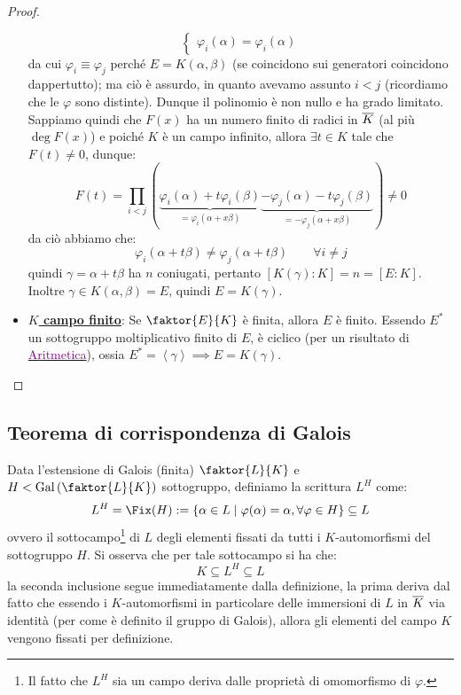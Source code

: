 \documentclass[11pt]{scrartcl}
\begin{document}
\begin{proof}
\begin{itemize}
\[\begin{cases}
                \varphi_i(\alpha) = \varphi_i(\alpha)
            \end{cases}
            \]
        da cui $\varphi_i \equiv \varphi_j$ perché $E = K(\alpha,\beta)$ (se coincidono sui generatori coincidono dappertutto); 
	ma ciò è assurdo, in quanto avevamo assunto $i < j$ (ricordiamo che le $\varphi$ sono distinte). Dunque il polinomio è non nullo e ha grado limitato. \\ \newpage
        Sappiamo quindi che $F(x)$ ha un numero finito di radici in $\overline K$ (al più $\deg F(x)$) e poiché $K$ è un campo infinito, 
	allora $\exists t \in K$ tale che $F(t) \ne 0$, dunque:
        \[ F(t) = \prod_{i<j} (\underbrace{\varphi_i(\alpha)+t\varphi_i(\beta)}_{ = \varphi_i(\alpha+x\beta)}\underbrace{-\varphi_j(\alpha)-t\varphi_j(\beta)}_{ = -\varphi_j(\alpha+x\beta)}) \ne 0
            \]
        da ciò abbiamo che:
        \[ \varphi_i(\alpha+t\beta) \ne \varphi_j(\alpha+t\beta) \qquad \forall i \ne j
            \]
        quindi $\gamma = \alpha+t\beta$ ha $n$ coniugati, pertanto $[K(\gamma) : K] = n = [E : K]$.
	Inoltre $\gamma \in K(\alpha,\beta) = E$, quindi $E = K(\gamma)$.
        \item \underline{\textbf{$K$ campo finito}}: 
	Se $\faktor{E}{K}$ è finita, allora $E$ è finito. Essendo $E^*$ un sottogruppo moltiplicativo finito di $E$, è ciclico 
	(per un risultato di \href{https://github.com/diego-unipi/Appunti-Aritmetica}{\textcolor{purple}{Aritmetica}}), 
	ossia $E^* = \left<\gamma\right> \implies E = K(\gamma)$.
        \end{itemize}
\end{proof}

\newpage
\subsection{Teorema di corrispondenza di Galois}
Data l'estensione di Galois (finita) $\faktor{L}{K}$ e $H < \Gal\left(\faktor{L}{K}\right)$ sottogruppo, definiamo la scrittura $L^H$ come:
\[ L^H = \Fix(H) := \{ \alpha \in L \mid \varphi(\alpha) = \alpha, \forall \varphi \in H \} \subseteq L
    \]
ovvero il sottocampo\footnote{Il fatto che $L^H$ sia un campo deriva dalle proprietà di omomorfismo di $\varphi$.} di $L$ degli elementi fissati da tutti i $K$-automorfismi del sottogruppo $H$. Si osserva che per tale sottocampo si ha che:
\[ K \subseteq L^H \subseteq L
    \]
la seconda inclusione segue immediatamente dalla definizione, 
la prima deriva dal fatto che essendo i $K$-automorfismi in particolare delle immersioni di $L$ in $\overline K$ via identità (per come è definito il gruppo di Galois),
allora gli elementi del campo $K$ vengono fissati per definizione.
\end{document}
